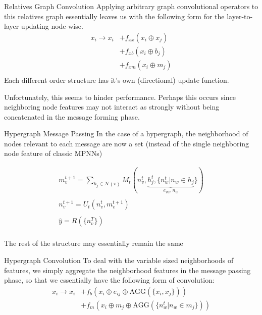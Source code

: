 \documentclass[11pt]{beamer}
\begin{document}
\begin{frame}{Relatives Graph Convolution}
Applying arbitrary graph convolutional operators to this relatives graph essentially leaves us with the following form for the layer-to-layer updating node-wise.
\begin{align*}
x_i\rightarrow x_i&+f_{xx}(x_i\oplus x_j)\\
				  &+f_{xb}(x_i\oplus b_j)\\
				  &+f_{xm}(x_i\oplus m_j)\\
\end{align*}
Each different order structure has it's own (directional) update function.

\medskip

Unfortunately, this seems to hinder performance. Perhaps this occurs since neighboring node features may not interact as strongly without being concatenated in the message forming phase.
\end{frame}

\begin{frame}{Hypergraph Message Passing}
In the case of a hypergraph, the neighborhood of nodes relevant to each message are now a set (instead of the single neighboring node feature of classic MPNNs)

\begin{gather*}
m_v^{t+1}=\sum_{h_j\in \mathcal{N}(v)} M_t(n_v^{t},\underbrace{h_j^{t},\lbrace  n_w^t \vert n_w \in h_j }_{e_{vw},n_w}\rbrace)\\
\\
n_v^{t+1}=U_t(n_v^t,m_v^{t+1})\\
\\
\hat{y}=R(\lbrace n_v^T\rbrace)\\
\end{gather*}

The rest of the structure may essentially remain the same

\end{frame}

\begin{frame}{Hypergraph Convolution}
To deal with the variable sized neighborhoods of features, we simply aggregate the neighborhood features in the message passing phase, so that we essentially have the following form of convolution:
\begin{align*}
x_i \rightarrow x_i &+ f_b(x_i\oplus e_{ij} \oplus \text{AGG}(\lbrace x_i, x_j\rbrace))\\
&+ f_m(x_i\oplus m_{j} \oplus \text{AGG}(\lbrace  n_w^t \vert n_w \in m_j \rbrace))
\end{align*}

\end{frame}
\end{document}
